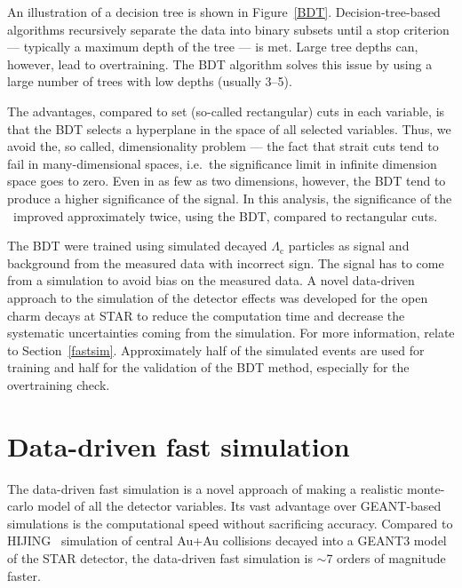 An illustration of a decision tree is shown in Figure~\ref{BDT}\@. Decision-tree-based algorithms recursively separate the data into binary subsets until a stop criterion --- typically a maximum depth of the tree --- is met. Large tree depths can, however, lead to overtraining. The BDT algorithm solves this issue by using a large number of trees with low depths (usually 3--5)\@.  


The advantages, compared to set (so-called rectangular) cuts in each variable, is that the BDT selects a hyperplane in the space of all selected variables. Thus, we avoid the, so called, dimensionality problem --- the fact that strait cuts tend to fail in many-dimensional spaces, i.e.\ the significance limit in infinite dimension space goes to zero. Even in as few as two dimensions, however, the BDT tend to produce a higher significance of the signal. In this analysis, the significance of the \Lambdac\ improved approximately twice, using the BDT, compared to rectangular cuts.




The BDT were trained using simulated decayed $\Lambda_\mathrm{c}$ particles as signal and background from the measured data with incorrect sign. The signal has to come from a simulation to avoid bias on the measured data. A novel data-driven approach to the simulation of the detector effects was developed for the open charm decays at STAR to reduce the computation time and decrease the systematic uncertainties coming from the simulation. For more information, relate to Section~\ref{fastsim}\@. Approximately half of the simulated events are used for training and half for the validation of the BDT method, especially for the overtraining check.




\section{Data-driven fast simulation\label{fastsim}}

The data-driven fast simulation is a novel approach of making a realistic monte-carlo model of all the detector variables. Its vast advantage over GEANT-based~\cite{GEANT} simulations is the computational speed without sacrificing accuracy. Compared to HIJING~\cite{HIJING} simulation of central Au+Au collisions decayed into a GEANT3 model of the STAR detector, the data-driven fast simulation is $\sim$7 orders of magnitude faster.

